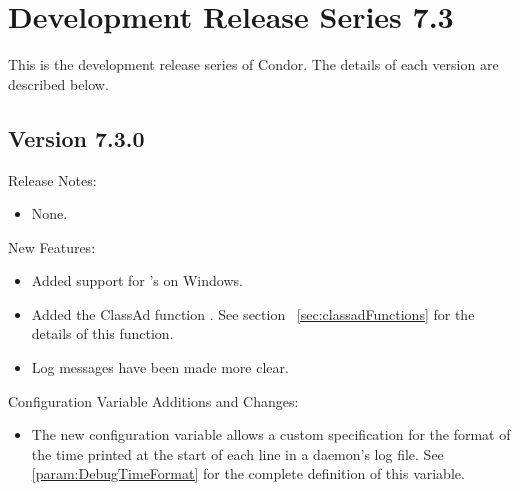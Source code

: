 
\section{\label{sec:History-7-3}Development Release Series 7.3}

This is the development release series of Condor.
The details of each version are described below.


\subsection*{\label{sec:New-7-3-0}Version 7.3.0}

\noindent Release Notes:

\begin{itemize}

\item None.

\end{itemize}


\noindent New Features:

\begin{itemize}

\item Added support for 's  on Windows.

\item Added the ClassAd function .
See section~ \ref{sec:classadFunctions} for the details of this function.

\item Log messages have been made more clear.


\end{itemize}

\noindent Configuration Variable Additions and Changes:

\begin{itemize}

\item The new configuration variable 
  allows a custom specification for the format of the time
  printed at the start of each line in a daemon's log file.
  See \ref{param:DebugTimeFormat} for the complete definition of
  this variable.

\end{itemize}

